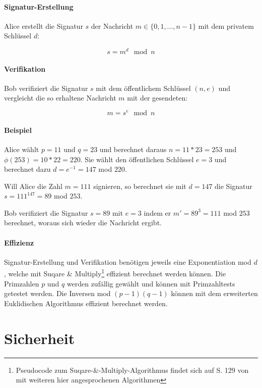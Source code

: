 \documentclass[a4paper,12pt,oneside]{scrreprt}
\begin{document}
\paragraph{Signatur-Erstellung}

Alice erstellt die Signatur $s$ der Nachricht $m \in \{0,1,\dots,n-1\}$ mit dem privatem Schlüssel $d$: 

\[ s = m^d \mod n \]

\paragraph{Verifikation}

Bob verifiziert die Signatur $s$ mit dem öffentlichem Schlüssel $(n,e)$ und vergleicht die so erhaltene Nachricht $m$ mit der gesendeten:

\[ m = s^e \mod n \]

\paragraph{Beispiel}

Alice wählt $p = 11$ und $q = 23$ und berechnet daraus $n = 11 * 23 = 253$ und $\phi(253) = 10 * 22 = 220$. Sie wählt den öffentlichen Schlüssel $e = 3$ und berechnet dazu $d = e^{-1} = 147$ mod $220$. 

Will Alice die Zahl $m = 111$ signieren, so berechnet sie mit $d = 147$ die Signatur $s = 111^{147} = 89$ mod $253$. 

Bob verifiziert die Signatur $s = 89$ mit $e=3$ indem er $m' = 89^3 = 111$ mod $253$ berechnet, woraus sich wieder die Nachricht ergibt. 

\paragraph{Effizienz}

Signatur-Erstellung und Verifikation benötigen jeweils eine Exponentiation mod $d$, welche mit Suqare \& Multiply\footnote{Pseudocode zum Suqare-\&-Multiply-Algorithmus findet sich auf S. 129 von \cite{beutelspacher2010moderne} mit weiteren hier angesprochenen Algorithmen} effizient berechnet werden können. Die Primzahlen $p$ und $q$ werden zufällig gewählt und können mit Primzahltests getestet werden. Die Inversen mod $(p-1)(q-1)$ können mit dem erweiterten Euklidischen Algorithmus effizient berechnet werden. 

\section{Sicherheit}
\end{document}
